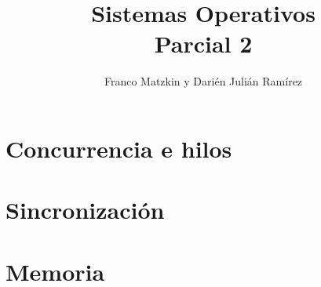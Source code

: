 \documentclass[a4paper,10pt,twoside,spanish]{article}
\title{\Huge\usefont{T1}{cms}{}{} Sistemas Operativos \\
								  Parcial 2} %
\author{Franco Matzkin y Darién Julián Ramírez} %
\date{\empty} %
\begin{document}
\maketitle %

\tableofcontents %

\section{Concurrencia e hilos}

\section{Sincronización}

\section{Memoria}
\end{document}
